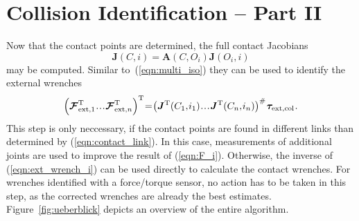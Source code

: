 \section{Collision Identification -- Part II}

Now that the contact points are determined, the full contact Jacobians
%
\begin{equation}
\bm{J}(C,i)=\bm{A}(C,O_i)\bm{J}(O_i,i)
\end{equation}
%
may be computed.
Similar to~(\ref{eqn:multi_iso}) they can be used to identify the external wrenches
%
\begin{equation}
\medmuskip=1mu
\thinmuskip=1mu
\thickmuskip=1mu
\left(
\bm{\mathcal{F}}_\mathrm{ext,1}^\mathrm{T} \ldots \bm{\mathcal{F}}_{\mathrm{ext},n}^\mathrm{T}\right)^\mathrm{T}=\left(
\bm{J}^\mathrm{T}(C_1,i_1) \ldots \bm{J}^\mathrm{T}(C_n,i_n)\right)^\#\bm{\tau}_\mathrm{ext,col}\;.
\label{eqn:force_identification}
\end{equation}
%
This step is only neccessary, if the contact points are found in different links than determined by (\ref{eqn:contact_link}).
In this case, measurements of additional joints are used to improve the result of (\ref{eqn:F_i}).
Otherwise, the inverse of (\ref{eqn:ext_wrench_i}) can be used directly to calculate the contact wrenches.
For wrenches identified with a force/torque sensor, no action has to be taken in this step, as the corrected wrenches are already the best estimates.
Figure~\ref{fig:ueberblick} depicts an overview of the entire algorithm.
%
